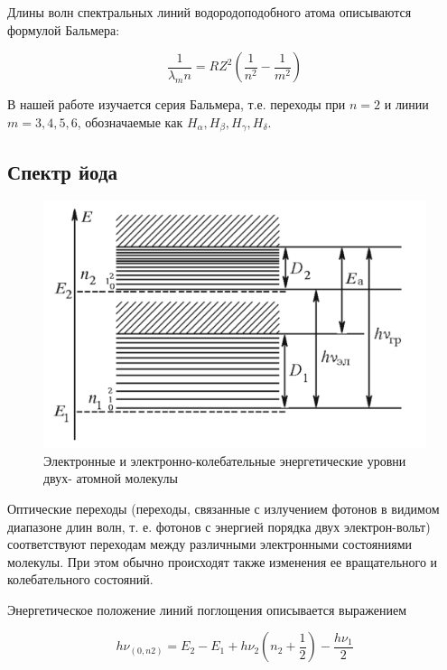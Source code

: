 \documentclass[12pt]{kiarticle}
\begin{document}
	Длины волн спектральных линий водородоподобного атома описываются формулой Бальмера:
	
	\begin{equation}\label{Balmer}
	\dfrac{1}{\lambda_mn} = R Z^2 \left( \dfrac{1}{n^2} - \dfrac{1}{m^2} \right) 
	\end{equation}
	
	В нашей работе изучается серия Бальмера, т.е. переходы при $ n = 2 $ и линии $ m = 3, 4, 5, 6 $, обозначаемые как $ H_\alpha, H_\beta, H_\gamma, H_\delta $.
	
	\subsection{Спектр йода}
	
	\begin{figure}
		\includegraphics[width=\linewidth]{iod}
		\caption{Электронные и электронно-колебательные энергетические уровни двух-
			атомной молекулы}
		\label{ris I(V)}
	\end{figure}
	
	Оптические переходы (переходы, связанные с излучением фотонов в видимом диапазоне длин волн, т. е. фотонов с энергией порядка двух электрон-вольт) соответствуют переходам между различными электронными состояниями молекулы. При этом обычно происходят также изменения ее вращательного и колебательного состояний. 
	
	Энергетическое положение линий поглощения описывается выражением
	
	\begin{equation}\label{iod}
	h\nu_{(0,n2)} = E_2 - E_1 + h\nu_2 \left( n_2 + \dfrac{1}{2} \right) - \dfrac{h \nu_1}{2}
	\end{equation}
	
\end{document}
